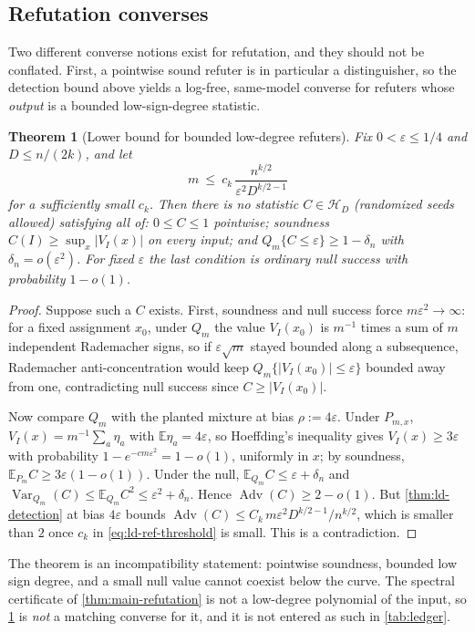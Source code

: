 \documentclass[11pt]{article}
\newtheorem{theorem}{Theorem}[section]
\theoremstyle{definition}
\theoremstyle{remark}
\newcommand{\E}{\mathbb E}
\newcommand{\1}{\mathbf 1}
\newcommand{\cH}{\mathcal H}
\newcommand{\eps}{\varepsilon}
\DeclareMathOperator{\Var}{Var}
\DeclareMathOperator{\Adv}{Adv}
\numberwithin{equation}{section}
\begin{document}
\subsection{Refutation converses}\label{sec:ref-converse}

Two different converse notions exist for refutation, and they should not
be conflated.  First, a pointwise sound refuter is in particular a
distinguisher, so the detection bound above yields a log-free,
same-model converse for refuters whose \emph{output} is a bounded
low-sign-degree statistic.

\begin{theorem}[Lower bound for bounded low-degree refuters]
\label{thm:ld-refutation}
Fix $0<\eps\le1/4$ and $D\le n/(2k)$, and let
\begin{equation}\label{eq:ld-ref-threshold}
 m\ \le\ c_k\,\frac{n^{k/2}}{\eps^2D^{k/2-1}}
\end{equation}
for a sufficiently small $c_k$.  Then there is no statistic
$C\in\cH_D$ (randomized seeds allowed) satisfying all of:
$0\le C\le1$ pointwise; soundness
$C(I)\ge\sup_x|V_I(x)|$ on every input; and
$Q_m\{C\le\eps\}\ge1-\delta_n$ with $\delta_n=o(\eps^2)$.
For fixed $\eps$ the last condition is ordinary null success with
probability $1-o(1)$.
\end{theorem}
\begin{proof}
Suppose such a $C$ exists.  First, soundness and null success force
$m\eps^2\to\infty$: for a fixed assignment $x_0$, under $Q_m$ the value
$V_I(x_0)$ is $m^{-1}$ times a sum of $m$ independent Rademacher signs,
so if $\eps\sqrt m$ stayed bounded along a subsequence, Rademacher
anti-concentration would keep $Q_m\{|V_I(x_0)|\le\eps\}$ bounded away
from one, contradicting null success since $C\ge|V_I(x_0)|$.

Now compare $Q_m$ with the planted mixture at bias $\rho:=4\eps$.  Under
$P_{m,x}$,
$V_I(x)=m^{-1}\sum_a\eta_a$ with $\E\eta_a=4\eps$, so Hoeffding's
inequality gives $V_I(x)\ge3\eps$ with probability
$1-e^{-cm\eps^2}=1-o(1)$, uniformly in $x$; by soundness,
$\E_{P_m}C\ge3\eps(1-o(1))$.  Under the null,
$\E_{Q_m}C\le\eps+\delta_n$ and
$\Var_{Q_m}(C)\le\E_{Q_m}C^2\le\eps^2+\delta_n$.  Hence
$\Adv(C)\ge2-o(1)$.  But \cref{thm:ld-detection} at bias $4\eps$ bounds
$\Adv(C)\le C_k\,m\eps^2D^{k/2-1}/n^{k/2}$, which is smaller than $2$
once $c_k$ in \cref{eq:ld-ref-threshold} is small.  This is a
contradiction.
\end{proof}

The theorem is an incompatibility statement: pointwise soundness,
bounded low sign degree, and a small null value cannot coexist below
the curve.  The spectral certificate of \cref{thm:main-refutation} is
not a low-degree polynomial of the input, so \cref{thm:ld-refutation}
is \emph{not} a matching converse for it, and it is not entered as
such in \cref{tab:ledger}.
\end{document}
